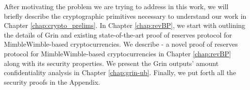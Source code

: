 After motivating the problem we are trying to address in this work, we will briefly describe the cryptographic primitives necessary to understand our work in Chapter \ref{chap:crypto_prelims}.
In Chapter \ref{chap:revBP}, we start with outlining the details of Grin and existing state-of-the-art proof of reserves protocol for MimbleWimble-based cryptocurrencies. 
We describe \RB - a novel proof of reserves protocol for MimbleWimble-based cryptocurrencies in Chapter \ref{chap:revBP} along with its security properties.
We present the Grin outputs' amount confidentiality analysis in Chapter \ref{chap:grin-ub}.
Finally, we put forth all the security proofs in the Appendix.  




